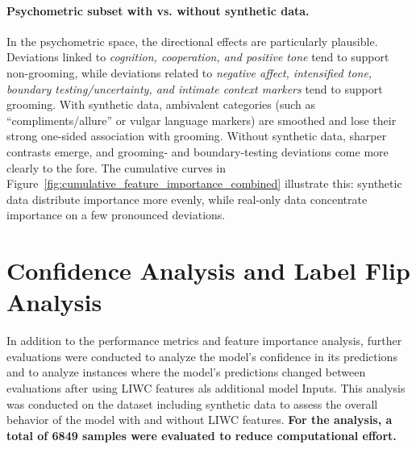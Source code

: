 \paragraph{Psychometric subset with vs. without synthetic data.}
In the psychometric space, the directional effects are particularly plausible. Deviations linked to \emph{cognition, cooperation, and positive tone} tend to support non-grooming, while deviations related to \emph{negative affect, intensified tone, boundary testing/uncertainty, and intimate context markers} tend to support grooming. With synthetic data, ambivalent categories (such as “compliments/allure” or vulgar language markers) are smoothed and lose their strong one-sided association with grooming. Without synthetic data, sharper contrasts emerge, and grooming- and boundary-testing deviations come more clearly to the fore. The cumulative curves in Figure~\ref{fig:cumulative_feature_importance_combined} illustrate this: synthetic data distribute importance more evenly, while real-only data concentrate importance on a few pronounced deviations.




\section{Confidence Analysis and Label Flip Analysis} \label{sec:confidence_and_label_flip_analysis}

In addition to the performance metrics and feature importance analysis, further evaluations were conducted to analyze the model's confidence in its predictions and to analyze instances where the model's predictions changed between evaluations after using LIWC features als additional model Inputs. This analysis was conducted on the dataset including synthetic data to assess the overall behavior of the model with and without LIWC features. \textbf{For the analysis, a total of 6849 samples were evaluated to reduce computational effort.}

